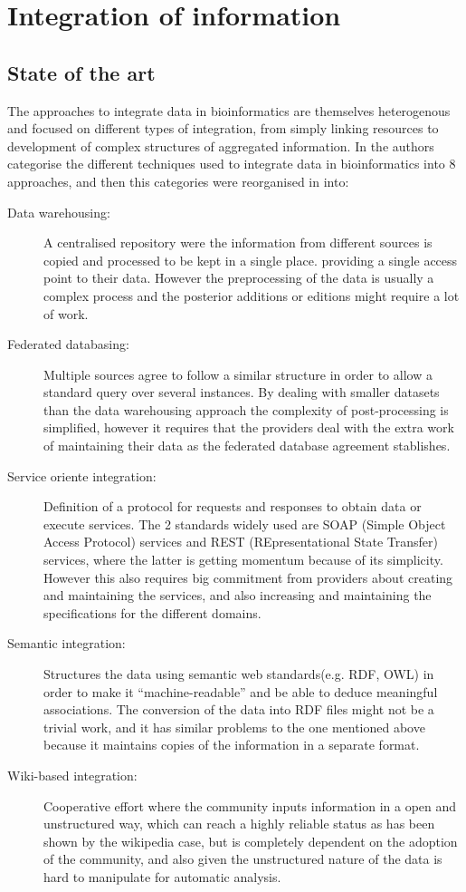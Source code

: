 \section{Integration of information}
\subsection{State of the art}
The approaches to integrate data in bioinformatics are themselves heterogenous and focused on different types of integration, from simply linking resources to development of complex structures of aggregated information. In \cite{GOB2008} the authors categorise the different techniques used to integrate data in bioinformatics into 8 approaches, and then this categories were reorganised in \cite{ZHA2011b} into:
\begin{description}
\item[Data warehousing:] 			A centralised repository were the information from different sources is copied and processed to be kept  in a single place. providing a single access point to their data. However the preprocessing of the data is usually a complex process and the posterior additions or editions might require a lot of work.
\item[Federated databasing:] 		Multiple sources agree to follow a similar structure in order to allow a standard query over several instances. By dealing with smaller datasets than the data warehousing approach the complexity of post-processing is simplified, however it requires that the providers deal with the extra work of maintaining their data as the federated database agreement stablishes.
\item[Service oriente integration:] 	Definition of a protocol for requests and responses to obtain data or execute services. The 2 standards widely used are SOAP (Simple Object Access Protocol) services and REST (REpresentational State Transfer) services, where the latter is getting momentum because of its simplicity. However this also requires big commitment from providers about creating and maintaining the services, and also increasing and maintaining the specifications for the different domains.
\item[Semantic integration:] 		Structures the data using semantic web standards(e.g. RDF, OWL) in order to make it ``machine-readable'' and be able to deduce meaningful associations. The conversion of the data into RDF files might not be a trivial work, and it has similar problems to the one mentioned above because it maintains copies of the information in a separate format. 
\item[Wiki-based integration:] 		Cooperative effort where the community inputs information in a open and unstructured way, which can reach a highly reliable status as has been shown by the wikipedia case, but is completely dependent on the adoption of the community, and also given the unstructured nature of the data is hard to manipulate for automatic analysis.
\end{description}

